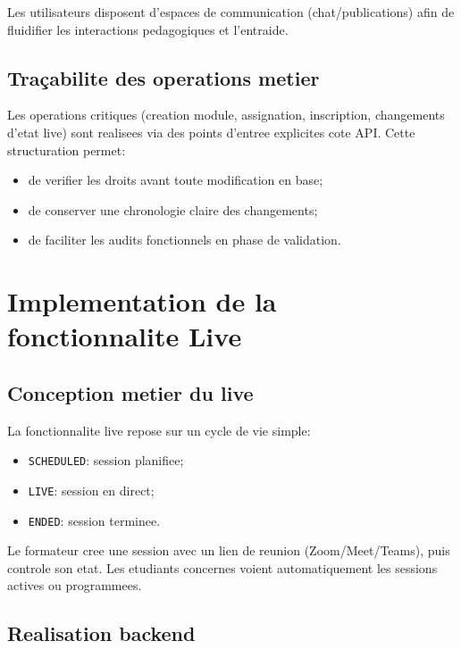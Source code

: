 ﻿\documentclass[12pt,a4paper,oneside]{report}
\begin{document}
Les utilisateurs disposent d'espaces de communication (chat/publications) afin de fluidifier les interactions pedagogiques et l'entraide.

\subsection{Traçabilite des operations metier}

Les operations critiques (creation module, assignation, inscription, changements d'etat live) sont realisees via des points d'entree explicites cote API. Cette structuration permet:
\begin{itemize}
  \item de verifier les droits avant toute modification en base;
  \item de conserver une chronologie claire des changements;
  \item de faciliter les audits fonctionnels en phase de validation.
\end{itemize}

\section{Implementation de la fonctionnalite Live}

\subsection{Conception metier du live}

La fonctionnalite live repose sur un cycle de vie simple:
\begin{itemize}
  \item \texttt{SCHEDULED}: session planifiee;
  \item \texttt{LIVE}: session en direct;
  \item \texttt{ENDED}: session terminee.
\end{itemize}

Le formateur cree une session avec un lien de reunion (Zoom/Meet/Teams), puis controle son etat. Les etudiants concernes voient automatiquement les sessions actives ou programmees.

\subsection{Realisation backend}
\end{document}

